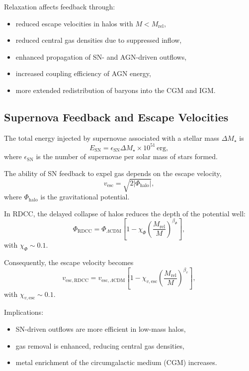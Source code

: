 \documentclass[11pt,a4paper]{article}
\begin{document}
Relaxation affects feedback through:
\begin{itemize}
\item reduced escape velocities in halos with $M < M_{\mathrm{rel}}$,
\item reduced central gas densities due to suppressed inflow,
\item enhanced propagation of SN- and AGN-driven outflows,
\item increased coupling efficiency of AGN energy,
\item more extended redistribution of baryons into the CGM and IGM.
\end{itemize}

\subsection{Supernova Feedback and Escape Velocities}

The total energy injected by supernovae associated with a stellar mass $\Delta M_{\star}$ is
\begin{equation}
E_{\mathrm{SN}}
=
\epsilon_{\mathrm{SN}}
\Delta M_{\star}
\times 10^{51}\,\mathrm{erg},
\end{equation}
where $\epsilon_{\mathrm{SN}}$ is the number of supernovae per solar mass of stars formed.

The ability of SN feedback to expel gas depends on the escape velocity,
\begin{equation}
v_{\mathrm{esc}}
=
\sqrt{2|\Phi_{\mathrm{halo}}|},
\end{equation}
where $\Phi_{\mathrm{halo}}$ is the gravitational potential.

In RDCC, the delayed collapse of halos reduces the depth of the potential well:
\begin{equation}
\Phi_{\mathrm{RDCC}}
=
\Phi_{\Lambda\mathrm{CDM}}
\left[
1
-
\chi_{\Phi}
\left(
\frac{M_{\mathrm{rel}}}{M}
\right)^{\beta_{\Phi}}
\right],
\end{equation}
with $\chi_{\Phi} \sim 0.1$.

Consequently, the escape velocity becomes
\begin{equation}
v_{\mathrm{esc,RDCC}}
=
v_{\mathrm{esc},\Lambda\mathrm{CDM}}
\left[
1
-
\chi_{v,\mathrm{esc}}
\left(
\frac{M_{\mathrm{rel}}}{M}
\right)^{\beta_{v}}
\right],
\end{equation}
with $\chi_{v,\mathrm{esc}} \sim 0.1$.

Implications:
\begin{itemize}
\item SN-driven outflows are more efficient in low-mass halos,
\item gas removal is enhanced, reducing central gas densities,
\item metal enrichment of the circumgalactic medium (CGM) increases.
\end{itemize}
\end{document}
